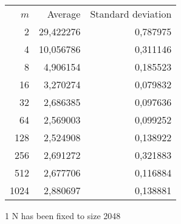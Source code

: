 \begin{tabular}{rrr}\
 $m$ & Average & Standard deviation  \\
2 &  29,422276 &  0,787975 \\ 
4 &  10,056786 &  0,311146 \\ 
8 &  4,906154 &  0,185523 \\ 
16 &  3,270274 &  0,079832 \\ 
32 &  2,686385 &  0,097636 \\ 
64 &  2,569003 &  0,099252 \\ 
128 &  2,524908 &  0,138922 \\ 
256 &  2,691272 &  0,321883 \\ 
512 &  2,677706 &  0,116884 \\ 
1024 &  2,880697 &  0,138881 \\ 
\end{tabular}
\begin{tablenotes}
\item[1] N has been fixed to size 2048
\end{tablenotes}
